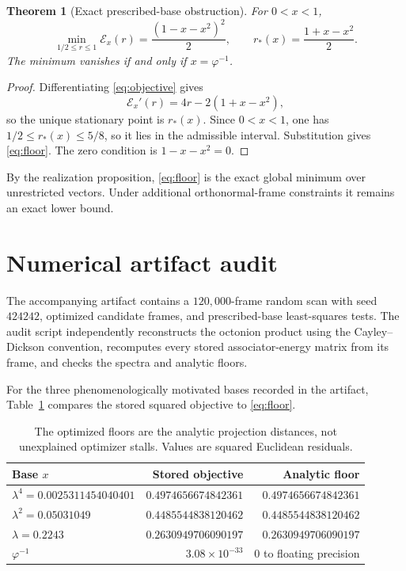 \documentclass[11pt]{article}
\newtheorem{theorem}{Theorem}[section]
\theoremstyle{remark}
\begin{document}
\begin{theorem}[Exact prescribed-base obstruction]
For $0<x<1$,
\begin{equation}
 \min_{1/2\le r\le1}\mathcal E_x(r)
 =\frac{(1-x-x^2)^2}{2},
 \qquad
 r_*(x)=\frac{1+x-x^2}{2}.
 \label{eq:floor}
\end{equation}
The minimum vanishes if and only if $x=\varphi^{-1}$.
\end{theorem}

\begin{proof}
Differentiating \eqref{eq:objective} gives
\[
 \mathcal E_x'(r)=4r-2(1+x-x^2),
\]
so the unique stationary point is $r_*(x)$.  Since $0<x<1$, one has $1/2\le r_*(x)\le5/8$, so it lies in the admissible interval.  Substitution gives \eqref{eq:floor}.  The zero condition is $1-x-x^2=0$.
\end{proof}

By the realization proposition, \eqref{eq:floor} is the exact global minimum over unrestricted vectors.  Under additional orthonormal-frame constraints it remains an exact lower bound.

\section{Numerical artifact audit}

The accompanying artifact contains a $120{,}000$-frame random scan with seed $424242$, optimized candidate frames, and prescribed-base least-squares tests.  The audit script independently reconstructs the octonion product using the Cayley--Dickson convention, recomputes every stored associator-energy matrix from its frame, and checks the spectra and analytic floors.

For the three phenomenologically motivated bases recorded in the artifact, Table~\ref{tab:floors} compares the stored squared objective to \eqref{eq:floor}.

\begin{table}[ht]
\centering
\begin{tabular}{lrr}
\toprule
Base $x$ & Stored objective & Analytic floor \\
\midrule
$\lambda^4=0.0025311454040401$ & $0.4974656674842361$ & $0.4974656674842361$ \\
$\lambda^2=0.05031049$ & $0.4485544838120462$ & $0.4485544838120462$ \\
$\lambda=0.2243$ & $0.2630949706090197$ & $0.2630949706090197$ \\
$\varphi^{-1}$ & $3.08\times10^{-33}$ & $0$ to floating precision \\
\bottomrule
\end{tabular}
\caption{The optimized floors are the analytic projection distances, not unexplained optimizer stalls.  Values are squared Euclidean residuals.}
\label{tab:floors}
\end{table}
\end{document}
